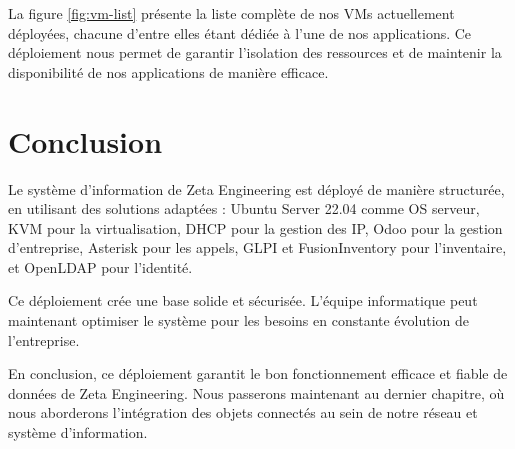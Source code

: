 La figure \ref{fig:vm-list} présente la liste complète de nos VMs actuellement déployées, chacune d'entre elles étant dédiée à l'une de nos applications. Ce déploiement nous permet de garantir l'isolation des ressources et de maintenir la disponibilité de nos applications de manière efficace.



\section{Conclusion}

Le système d'information de Zeta Engineering est déployé de manière structurée, en utilisant des solutions adaptées : Ubuntu Server 22.04 comme OS serveur, KVM pour la virtualisation, DHCP pour la gestion des IP, Odoo pour la gestion d'entreprise, Asterisk pour les appels, GLPI et FusionInventory pour l'inventaire, et OpenLDAP pour l'identité.

Ce déploiement crée une base solide et sécurisée. L'équipe informatique peut maintenant optimiser le système pour les besoins en constante évolution de l'entreprise.

En conclusion, ce déploiement garantit le bon fonctionnement efficace et fiable de données de Zeta Engineering. Nous passerons maintenant au dernier chapitre, où nous aborderons l'intégration des objets connectés au sein de notre réseau et système d'information.




